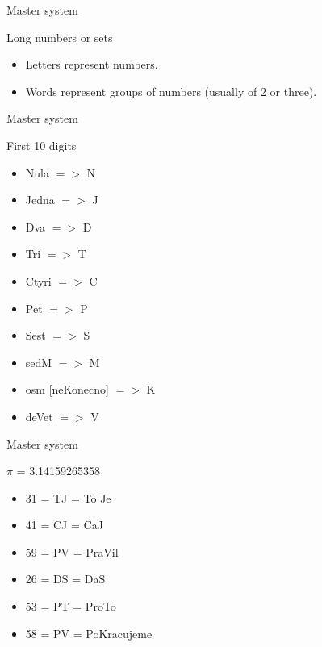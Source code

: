 \begin{frame}{Master system}
  \begin{block}{Long numbers or sets}
    \begin{itemize}
      \item Letters represent numbers. 
      \item Words represent groups of numbers (usually of 2 or three).
    \end{itemize}
  \end{block}
\end{frame}

\begin{frame}{Master system}
  \begin{block}{First 10 digits}
    \begin{itemize}
      \item Nula $=>$ N 
      \item Jedna $=>$ J
      \item Dva $=>$ D
      \item Tri $=>$ T
      \item Ctyri $=>$ C
      \item Pet $=>$ P
      \item Sest $=>$ S
      \item sedM $=>$ M
      \item osm [neKonecno] $=>$ K
      \item deVet $=>$ V
    \end{itemize}
  \end{block}
\end{frame}

\begin{frame}{Master system}
  \begin{block}{$\pi$ = 3.14159265358}
    \begin{itemize}
      \item 31 = TJ = To Je
      \item 41 = CJ = CaJ
      \item 59 = PV = PraVil
      \item 26 = DS = DaS
      \item 53 = PT = ProTo
      \item 58 = PV = PoKracujeme
    \end{itemize}
  \end{block}
\end{frame}

